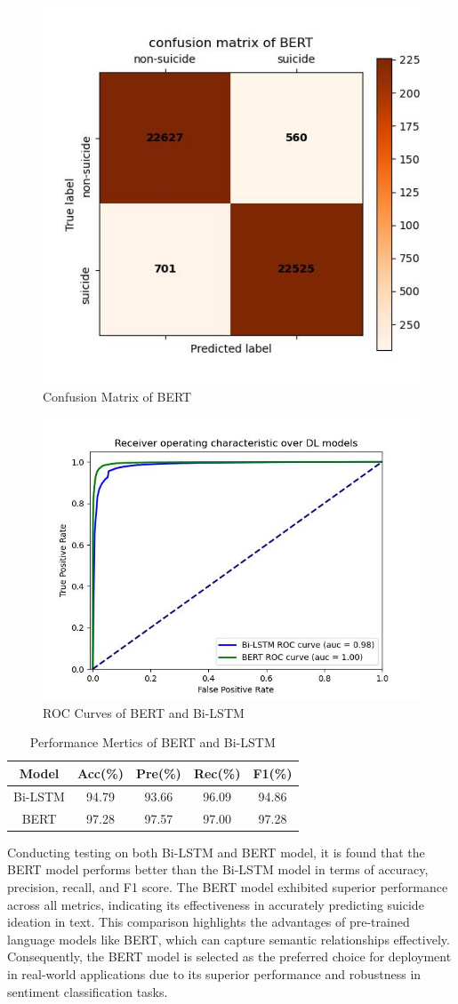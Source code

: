 \documentclass[ %
                    author={Bocheng Wang},
                supervisor={Dr. Qiang Liu},
                    degree={MSc},
                     title={A Research on Identification of Suicide Ideation in Texts with Multiple Models},
                      type={},
                      year={2024}]{dissertation}
\begin{document}
\begin{figure}[h]
      \centering
      \includegraphics[width=0.46\linewidth]{../img/cm_BERT.jpg}
      \caption{Confusion Matrix of BERT}
      \label{fig:cm_BERT}
\end{figure}

\begin{figure}[!h]
      \centering
      \includegraphics[width=0.5\linewidth]{../img/roc_BERT&LSTM.jpg}
      \caption{ROC Curves of BERT and Bi-LSTM}
      \label{fig:rocLSTMBERT}
\end{figure}

\begin{table}[!h]
      \centering
      \begin{tabular}{c|cccc}
            \hline
            Model & Acc(\%) & Pre(\%) & Rec(\%) & F1(\%) \\
            \hline
            Bi-LSTM & 94.79 & 93.66 & 96.09 & 94.86 \\
            BERT    & 97.28 & 97.57 & 97.00 & 97.28 \\
            \hline
      \end{tabular}
      \caption{Performance Mertics of BERT and Bi-LSTM}
      \label{tab:bertmetrics}
\end{table}

Conducting testing on both Bi-LSTM and BERT model, it is found that the BERT model performs better than the Bi-LSTM model in terms of accuracy, precision, recall, and F1 score. The BERT model exhibited superior performance across all metrics, indicating its effectiveness in accurately predicting suicide ideation in text. This comparison highlights the advantages of pre-trained language models like BERT, which can capture semantic relationships effectively. Consequently, the BERT model is selected as the preferred choice for deployment in real-world applications due to its superior performance and robustness in sentiment classification tasks.
\end{document}
